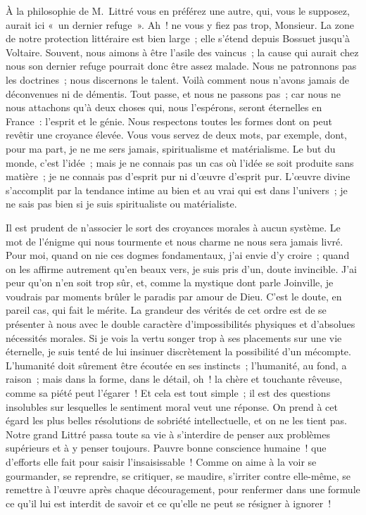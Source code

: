 \documentclass[french,twoside]{book} %
\newcommand\persName[1]{#1}
\newcommand\placeName[1]{#1}
\begin{document}
À la philosophie de {\persName M. Littré} vous en préférez une autre, qui, vous le supposez, aurait ici « un dernier refuge ». Ah ! ne vous y fiez pas trop, Monsieur. La zone de notre protection littéraire est bien large ; elle s’étend depuis {\persName Bossuet} jusqu’à {\persName Voltaire}. Souvent, nous aimons à être l’asile des vaincus ; la cause qui aurait chez nous son dernier refuge pourrait donc être assez malade. Nous ne patronnons pas les doctrines ; nous discernons le talent. Voilà comment nous n’avons jamais de déconvenues ni de démentis. Tout passe, et nous ne passons pas ; car nous ne nous attachons qu’à deux choses qui, nous l’espérons, seront éternelles en {\placeName France} : l’esprit et le génie. Nous respectons toutes les formes dont on peut revêtir une croyance élevée. Vous vous servez de deux mots, par exemple, dont, pour ma part, je ne me sers jamais, spiritualisme et matérialisme. Le but du monde, c’est l’idée ; mais je ne connais pas un cas où l’idée se soit produite sans matière ; je ne connais pas d’esprit pur ni d’œuvre d’esprit pur. L’œuvre divine s’accomplit par la tendance intime au bien et au vrai qui est dans l’univers ; je ne sais pas bien si je suis spiritualiste ou matérialiste.\par
Il est prudent de n’associer le sort des croyances morales à aucun système. Le mot de l’énigme qui nous tourmente et nous charme ne nous sera jamais livré. Pour moi, quand on nie ces dogmes fondamentaux, j’ai envie d’y croire ; quand on les affirme autrement qu’en beaux vers, je suis pris d’un, doute invincible. J’ai peur qu’on n’en soit trop sûr, et, comme la mystique dont parle Joinville, je voudrais par moments brûler le paradis par amour de Dieu. C’est le doute, en pareil cas, qui fait le mérite. La grandeur des vérités de cet ordre est de se présenter à nous avec le double caractère d’impossibilités physiques et d’absolues nécessités morales. Si je vois la vertu songer trop à ses placements sur une vie éternelle, je suis tenté de lui insinuer discrètement la possibilité d’un mécompte. L’humanité doit sûrement être écoutée en ses instincts ; l’humanité, au fond, a raison ; mais dans la forme, dans le détail, oh ! la chère et touchante rêveuse, comme sa piété peut l’égarer ! Et cela est tout simple ; il est des questions insolubles sur lesquelles le sentiment moral veut une réponse. On prend à cet égard les plus belles résolutions de sobriété intellectuelle, et on ne les tient pas. Notre grand {\persName Littré} passa toute sa vie à s’interdire de penser aux problèmes supérieurs et à y penser toujours. Pauvre bonne conscience humaine ! que d’efforts elle fait pour saisir l’insaisissable ! Comme on aime à la voir se gourmander, se reprendre, se critiquer, se maudire, s’irriter contre elle-même, se remettre à l’œuvre après chaque découragement, pour renfermer dans une formule ce qu’il lui est interdit de savoir et ce qu’elle ne peut se résigner à ignorer !\par
\end{document}
